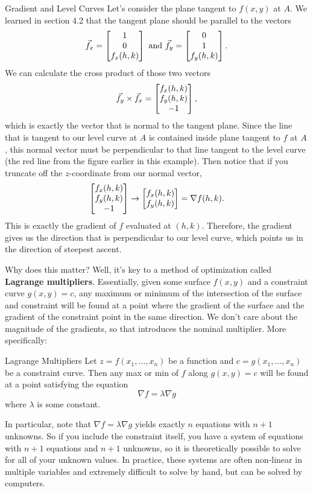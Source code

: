 \begin{example}{Gradient and Level Curves}
Let's consider the plane tangent to $f(x,y)$ at $A$. We learned in section 4.2 that the tangent plane should be parallel to the vectors $$\vec{f}_x=\begin{bmatrix}1\\0\\f_x(h,k)\end{bmatrix}\text{ and } \vec{f}_y=\begin{bmatrix}0\\1\\f_y(h,k)\end{bmatrix}.$$ We can calculate the cross product of those two vectors $$\vec{f}_y\times\vec{f}_x=\begin{bmatrix}f_x(h,k)\\f_y(h,k)\\-1\end{bmatrix},$$ which is exactly the vector that is normal to the tangent plane. Since the line that is tangent to our level curve at $A$ is contained inside plane tangent to $f$ at $A$, this normal vector must be perpendicular to that line tangent to the level curve (the red line from the figure earlier in this example). Then notice that if you truncate off the $z$-coordinate from our normal vector, $$ \begin{bmatrix}f_x(h,k)\\f_y(h,k)\\-1\end{bmatrix}\to \begin{bmatrix}f_x(h,k)\\f_y(h,k)\end{bmatrix}=\nabla f(h,k).$$ This is exactly the gradient of $f$ evaluated at $(h,k)$. Therefore, the gradient gives us the direction that is perpendicular to our level curve, which points us in the direction of steepest ascent.
\vspace{1em}
\end{example}

Why does this matter? Well, it's key to a method of optimization called \textbf{Lagrange multipliers}. Essentially, given some surface $f(x,y)$ and a constraint curve $g(x,y)=c$, any maximum or minimum of the intersection of the surface and constraint will be found at a point where the gradient of the surface and the gradient of the constraint point in the same direction. We don't care about the magnitude of the gradients, so that introduces the nominal multiplier. More specifically:

\begin{theorem}{Lagrange Multipliers}
Let $z=f(x_1,\ldots, x_n)$ be a function and $c=g(x_1,\ldots,x_n)$ be a constraint curve. Then any max or min of $f$ along $g(x,y)=c$ will be found at a point satisfying the equation $$\nabla f=\lambda \nabla g $$ where $\lambda$ is some constant.
\end{theorem}

In particular, note that $\nabla f=\lambda \nabla g$ yields exactly $n$ equations with $n+1$ unknowns. So if you include the constraint itself, you have a system of equations with $n+1$ equations and $n+1$ unknowns, so it is theoretically possible to solve for all of your unknown values. In practice, these systems are often non-linear in multiple variables and extremely difficult to solve by hand, but can be solved by computers.

